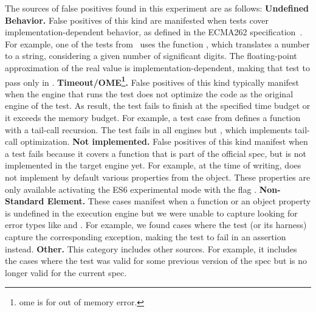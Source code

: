 \documentclass[10pt,conference,anonymous]{IEEEtran}
\begin{document}

The sources of false positives found in this experiment are as
follows: \textbf{Undefined Behavior.} False positives of this kind are
manifested when tests cover implementation-dependent behavior, as
defined in the ECMA262 specification~\cite{ecmas262-spec}. For
example, one of the tests from \jerry\ uses the function
, which translates a number to
a string, considering a given number of significant digits. The
floating-point approximation of the real value is
implementation-dependent, making that test to pass only in
\chakra. \textbf{Timeout/OME\footnote{ome is for out of memory
    error.}.} False positives of this kind typically manifest when the
engine that runs the test does not optimize the code as the original
engine of the test. As result, the test fails to finish at the
specified time budget or it exceeds the memory budget. For example, a
test case from \jsc{} defines a function with a tail-call
recursion. The test fails in all engines but \jsc{}, which implements
tail-call optimization. \textbf{Not implemented.} False positives of
this kind manifest when a test fails because it covers a function that
is part of the official spec, but is not implemented in the target
engine yet. For example, at the time of writing, \chakra{} does not
implement by default various properties from the 
object. These properties are only available activating the ES6
experimental mode with the flag .
\textbf{Non-Standard Element.} These cases manifest when a function or
an object property is undefined in the execution engine but we were
unable to capture looking for error types like 
and . For example, we found cases where the test (or
its harness) capture the corresponding exception, making the test to
fail in an assertion instead.  \textbf{Other.} This category includes
other sources. For example, it includes the cases where the test was
valid for some previous version of the spec but is no longer valid for
the current spec.

\end{document}
